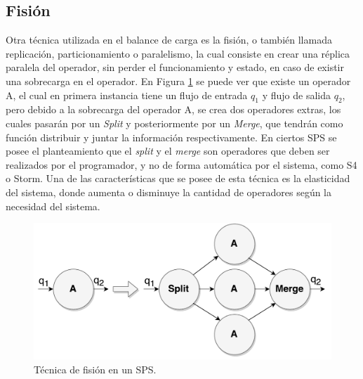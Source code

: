 \subsection{Fisión}
\label{sec:fisionBC}


Otra técnica utilizada en el balance de carga es la fisión, o también llamada replicación, particionamiento o paralelismo, la cual consiste en crear una réplica paralela del operador, sin perder el funcionamiento y estado, en caso de existir una sobrecarga en el operador. En Figura \ref{fig:fision} se puede ver que existe un operador A, el cual en primera instancia tiene un flujo de entrada $q_1$ y flujo de salida $q_2$, pero debido a la sobrecarga del operador A, se crea dos operadores extras, los cuales pasarán por un \textit{Split} y posteriormente por un \textit{Merge}, que tendrán como función distribuir y juntar la información respectivamente. En ciertos SPS se posee el planteamiento que el \textit{split} y el \textit{merge} son operadores que deben ser realizados por el programador, y no de forma automática por el sistema, como S4 o Storm. Una de las características que se posee de esta técnica es la elasticidad del sistema, donde aumenta o disminuye la cantidad de operadores según la necesidad del sistema.

\begin{figure}[!ht]
	\centering
	\includegraphics[scale=0.4]{images/Fision.pdf}
	\caption{Técnica de fisión en un SPS.}
	\label{fig:fision}
\end{figure}

